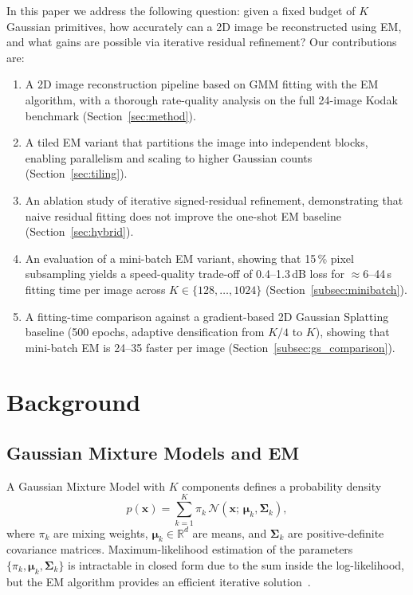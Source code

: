 \documentclass[a4paper,conference]{IEEEtran}
\begin{document}
In this paper we address the following question: given a fixed budget of $K$
Gaussian primitives, how accurately can a 2D image be reconstructed using EM,
and what gains are possible via iterative residual refinement?
Our contributions are:
\begin{enumerate}
  \item A 2D image reconstruction pipeline based on GMM fitting with the EM
        algorithm, with a thorough rate-quality analysis on the full
        24-image Kodak benchmark (Section~\ref{sec:method}).
  \item A tiled EM variant that partitions the image into independent
        blocks, enabling parallelism and scaling to higher Gaussian counts
        (Section~\ref{sec:tiling}).
  \item An ablation study of iterative signed-residual refinement,
        demonstrating that naive residual fitting does not improve the
        one-shot EM baseline (Section~\ref{sec:hybrid}).
  \item An evaluation of a mini-batch EM variant, showing that 15\,\%
        pixel subsampling yields a speed-quality trade-off of
        0.4--1.3\,dB loss for $\approx$6--44\,s fitting time per image
        across $K\!\in\!\{128,\ldots,1024\}$
        (Section~\ref{subsec:minibatch}).
  \item A fitting-time comparison against a gradient-based 2D Gaussian
        Splatting baseline (500 epochs, adaptive densification from
        $K/4$ to $K$), showing that mini-batch EM is 24--35{\texttimes}
        faster per image (Section~\ref{subsec:gs_comparison}).
\end{enumerate}


\section{Background}
\label{sec:background}

\subsection{Gaussian Mixture Models and EM}
\label{subsec:gmm}

A Gaussian Mixture Model with $K$ components defines a probability density
\begin{equation}
  p(\mathbf{x}) = \sum_{k=1}^{K} \pi_k \, \mathcal{N}(\mathbf{x};\,\boldsymbol{\mu}_k,\boldsymbol{\Sigma}_k),
  \label{eq:gmm}
\end{equation}
where $\pi_k$ are mixing weights, $\boldsymbol{\mu}_k \in \mathbb{R}^d$ are
means, and $\boldsymbol{\Sigma}_k$ are positive-definite covariance matrices.
Maximum-likelihood estimation of the parameters
$\{\pi_k, \boldsymbol{\mu}_k, \boldsymbol{\Sigma}_k\}$ is intractable in closed
form due to the sum inside the log-likelihood, but the EM algorithm provides an
efficient iterative solution~\cite{dempster1977em}.
\end{document}
